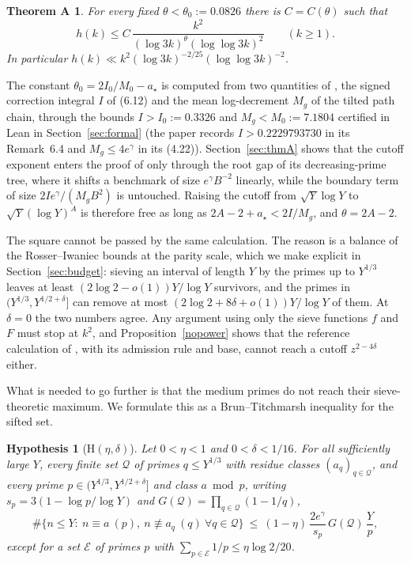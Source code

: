 \documentclass[11pt]{amsart}
\newtheorem{hypothesis}[lemma]{Hypothesis}
\newtheorem*{theoremA}{Theorem A}
\newcommand{\Mg}{M_g}
\newcommand{\astar}{a_\star}
\begin{document}
\begin{theoremA}
For every fixed $\theta<\theta_0:=0.0826$ there is $C=C(\theta)$ such that
\[
h(k)\le C\,\frac{k^2}{(\log 3k)^{\theta}(\log\log 3k)^2}\qquad(k\ge1).
\]
In particular $h(k)\ll k^2(\log 3k)^{-2/25}(\log\log 3k)^{-2}$.
\end{theoremA}

The constant $\theta_0=2I_0/M_0-\astar$ is computed from two quantities of \cite{OAI}, the signed correction integral $I$ of (6.12) and the mean log-decrement $\Mg$ of the tilted path chain, through the bounds $I>I_0:=0.3326$ and $\Mg<M_0:=7.1804$ certified in Lean in Section~\ref{sec:formal} (the paper \cite{OAI} records $I>0.2229793730$ in its Remark~6.4 and $\Mg\le4e^\gamma$ in its (4.22)). Section~\ref{sec:thmA} shows that the cutoff exponent enters the proof of \cite{OAI} only through the root gap of its decreasing-prime tree, where it shifts a benchmark of size $e^{\gamma}B^{-2}$ linearly, while the boundary term of size $2Ie^\gamma/(\Mg B^2)$ is untouched. Raising the cutoff from $\sqrt Y\log Y$ to $\sqrt Y(\log Y)^A$ is therefore free as long as $2A-2+\astar<2I/\Mg$, and $\theta=2A-2$.

\medskip
The square cannot be passed by the same calculation. The reason is a balance of the Rosser--Iwaniec bounds at the parity scale, which we make explicit in Section~\ref{sec:budget}: sieving an interval of length $Y$ by the primes up to $Y^{1/3}$ leaves at least $(2\log2-o(1))Y/\log Y$ survivors, and the primes in $(Y^{1/3},Y^{1/2+\delta}]$ can remove at most $(2\log2+8\delta+o(1))Y/\log Y$ of them. At $\delta=0$ the two numbers agree. Any argument using only the sieve functions $f$ and $F$ must stop at $k^2$, and Proposition~\ref{nopower} shows that the reference calculation of \cite{OAI}, with its admission rule and base, cannot reach a cutoff $z^{2-4\delta}$ either.

What is needed to go further is that the medium primes do not reach their sieve-theoretic maximum. We formulate this as a Brun--Titchmarsh inequality for the sifted set.

\begin{hypothesis}[$\mathrm H(\eta,\delta)$]\label{H}
Let $0<\eta<1$ and $0<\delta<1/16$. For all sufficiently large $Y$, every finite set $\mathcal Q$ of primes $q\le Y^{1/3}$ with residue classes $(a_q)_{q\in\mathcal Q}$, and every prime $p\in(Y^{1/3},Y^{1/2+\delta}]$ and class $a\bmod p$, writing $s_p=3(1-\log p/\log Y)$ and $G(\mathcal Q)=\prod_{q\in\mathcal Q}(1-1/q)$,
\[
\#\{n\le Y:\ n\equiv a\ (p),\ n\not\equiv a_q\ (q)\ \forall q\in\mathcal Q\}\ \le\ (1-\eta)\,\frac{2e^{\gamma}}{s_p}\,G(\mathcal Q)\,\frac{Y}{p},
\]
except for a set $\mathcal E$ of primes $p$ with $\sum_{p\in\mathcal E}1/p\le\eta\log2/20$.
\end{hypothesis}
\end{document}
